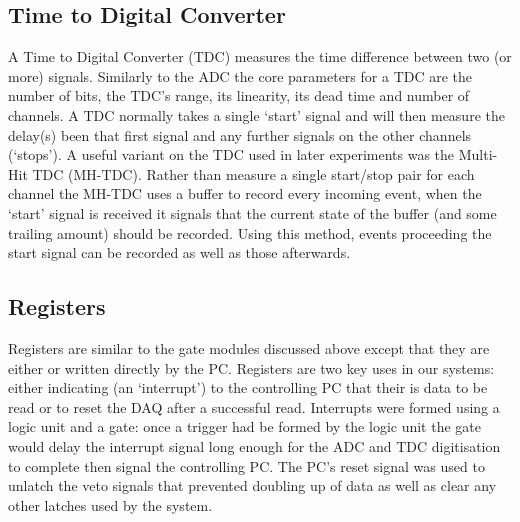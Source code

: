 \subsection{Time to Digital Converter} %
\label{ssub:time_to_digital_converter}
A Time to Digital Converter (TDC) measures the time difference between two (or more) signals. Similarly to the ADC the core parameters for a TDC are the number of bits, the TDC's range, its linearity, its dead time and number of channels. A TDC normally takes a single `start' signal and will then measure the delay(s) been that first signal and any further signals on the other channels (`stops'). A useful variant on the TDC used in later experiments was the Multi-Hit TDC (MH-TDC). Rather than measure a single start/stop pair for each channel the MH-TDC uses a buffer to record every incoming event, when the `start' signal is received it signals that the current state of the buffer (and some trailing amount) should be recorded. Using this method, events proceeding the start signal can be recorded as well as those afterwards.

\subsection{Registers} %
\label{ssub:registers}
Registers are similar to the gate modules discussed above except that they are either or written directly by the PC. Registers are two key uses in our systems: either indicating (an `interrupt') to the controlling PC that their is data to be read or to reset the DAQ after a successful read. Interrupts were formed using a logic unit and a gate: once a trigger had be formed by the logic unit the gate would delay the interrupt signal long enough for the ADC and TDC digitisation to complete then signal the controlling PC. The PC's reset signal was used to unlatch the veto signals that prevented doubling up of data as well as clear any other latches used by the system.


